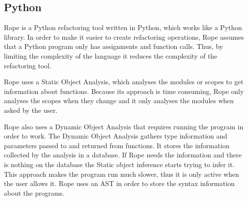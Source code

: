 

\subsection{Python}

Rope\cite[p.~109]{govindaraj2015test} is a Python refactoring tool
written in Python, which works like a Python library.  In order to
make it easier to create refactoring operations, Rope assumes that a
Python program only has assignments and function
calls. %
Thus, by limiting the complexity of the language it reduces the
complexity of the refactoring tool.

Rope uses a Static Object Analysis, which analyses the modules or
scopes to get information about functions.  Because its approach is
time consuming, Rope only analyses the scopes when they change and it
only analyses the modules when asked by the user.

Rope also uses a Dynamic Object Analysis that requires running the
program in order to work.  The Dynamic Object Analysis gathers type
information and parameters passed to and returned from functions.  It
stores the information collected by the analysis in a database.  If
Rope needs the information and there is nothing on the database the
Static object inference starts trying to infer it.  This approach
makes the program run much slower, thus it is only active when the
user allows it. %
Rope uses an AST in order to store the syntax information about the programs.\\

